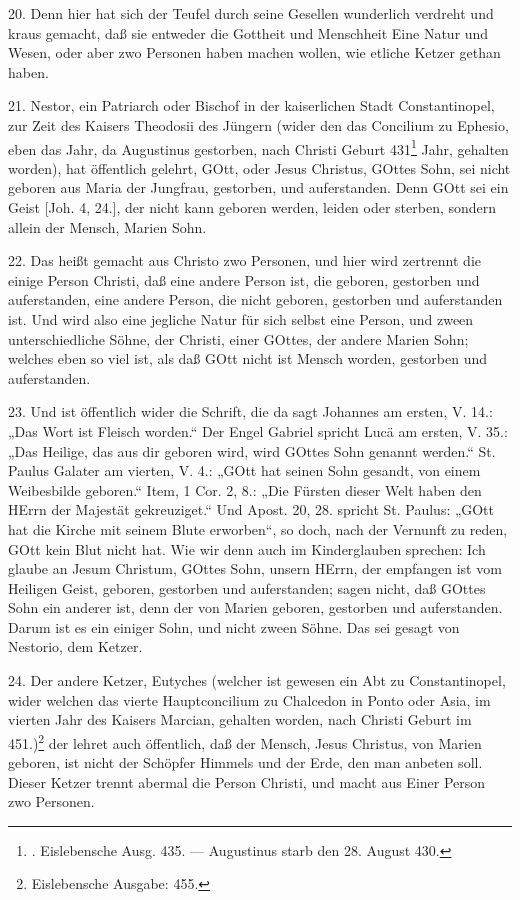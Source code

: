 20. Denn hier hat sich der Teufel durch seine Gesellen wunderlich verdreht und kraus gemacht, daß sie entweder die Gottheit und Menschheit Eine Natur und Wesen, oder aber zwo Personen haben machen wollen, wie etliche Ketzer gethan haben.

21. Nestor, ein Patriarch oder Bischof in der kaiserlichen Stadt Constantinopel, zur Zeit des Kaisers Theodosii des Jüngern (wider den das Concilium zu Ephesio, eben das Jahr, da Augustinus gestorben, nach Christi Geburt 431\footnote{. Eislebensche Ausg. 435. — Augustinus starb den 28. August 430.} Jahr, gehalten worden), hat öffentlich gelehrt, GOtt, oder Jesus Christus, GOttes Sohn, sei nicht geboren aus Maria der Jungfrau, gestorben, und auferstanden. Denn GOtt sei ein Geist [Joh. 4, 24.], der nicht kann geboren werden, leiden oder sterben, sondern allein der Mensch, Marien Sohn.

22. Das heißt gemacht aus Christo zwo Personen, und hier wird zertrennt die einige Person Christi, daß eine andere Person ist, die geboren, gestorben und auferstanden, eine andere Person, die nicht geboren, gestorben und auferstanden ist. Und wird also eine jegliche Natur für sich selbst eine Person, und zween unterschiedliche Söhne, der Christi, einer GOttes, der andere Marien Sohn; welches eben so viel ist, als daß GOtt nicht ist Mensch worden, gestorben und auferstanden.

23. Und ist öffentlich wider die Schrift, die da sagt Johannes am ersten, V. 14.: „Das Wort ist Fleisch worden.“ Der Engel Gabriel spricht Lucä am ersten, V. 35.: „Das Heilige, das aus dir geboren wird, wird GOttes Sohn genannt werden.“ St. Paulus Galater am vierten,
V. 4.: „GOtt hat seinen Sohn gesandt, von einem Weibesbilde geboren.“ Item, 1 Cor. 2, 8.: „Die Fürsten dieser Welt haben den HErrn der Majestät gekreuziget.“ Und Apost. 20, 28. spricht St. Paulus: „GOtt hat die Kirche mit seinem Blute erworben“, so doch, nach der Vernunft zu reden, GOtt kein Blut nicht hat. Wie wir denn auch im Kinderglauben sprechen: Ich glaube an Jesum Christum, GOttes Sohn, unsern HErrn, der empfangen ist vom Heiligen Geist, geboren, gestorben und auferstanden; sagen nicht, daß GOttes Sohn ein anderer ist, denn der von Marien geboren, gestorben und auferstanden. Darum ist es ein einiger Sohn, und nicht zween Söhne. Das sei gesagt von Nestorio, dem Ketzer.

24. Der andere Ketzer, Eutyches (welcher ist gewesen ein Abt zu Constantinopel, wider welchen das vierte Hauptconcilium zu Chalcedon in Ponto oder Asia, im vierten Jahr des Kaisers Marcian, gehalten worden, nach Christi Geburt im 451.)\footnote{Eislebensche Ausgabe: 455.} der lehret auch öffentlich, daß der Mensch, Jesus Christus, von Marien geboren, ist nicht der Schöpfer Himmels und der Erde, den man anbeten soll. Dieser Ketzer trennt abermal die Person Christi, und macht aus Einer Person zwo Personen.

